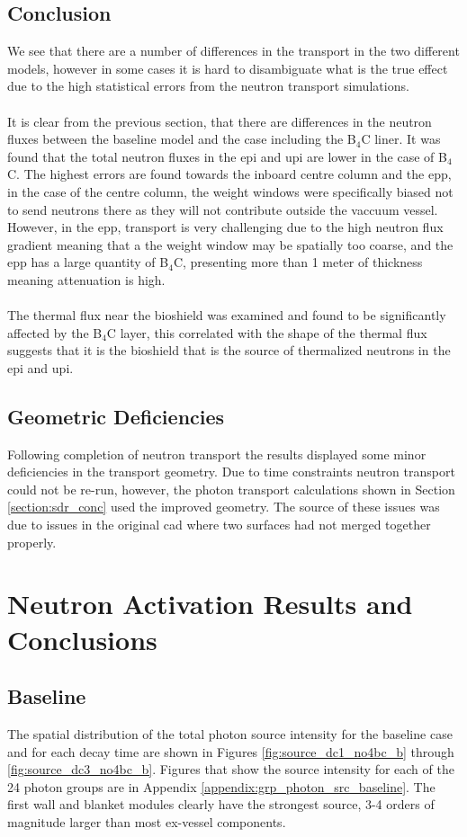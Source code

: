 \documentclass[12pt]{article}
\begin{document}
\subsection{Conclusion}
We see that there are a number of differences in the transport in the two different models,
however in some cases it is hard to disambiguate what is the true effect due to the high 
statistical errors from the neutron transport simulations. 
\\
\\
It is clear from the previous section, that there are differences in the neutron fluxes 
between the baseline model and the case including the B$_4$C liner. It was found that 
the total neutron fluxes in the \gls{epi} and \gls{upi} are lower in the case of B$_4$C.
The highest errors are found towards the inboard centre column and the \gls{epp}, 
in the case of the centre column, the weight windows were specifically biased not to send
neutrons there as they will not contribute outside the vaccuum vessel. However, in the 
\gls{epp}, transport is very challenging due to the high neutron flux gradient meaning that
a the weight window may be spatially too coarse, and the \gls{epp} has a large quantity of
B$_4$C, presenting more than 1 meter of thickness meaning attenuation is high. 
\\
\\
The thermal flux near the bioshield was examined and found to be significantly affected
by the B$_4$C layer, this correlated with the shape of the thermal flux suggests that 
it is the bioshield that is the source of thermalized neutrons in the \gls{epi} and \gls{upi}.
\subsection*{Geometric Deficiencies}
Following completion of neutron transport the results displayed some minor deficiencies in 
the transport geometry. Due to time constraints neutron transport could not be re-run, however,
the photon transport calculations shown in Section \ref{section:sdr_conc} used the improved geometry.
The source of these issues was due to issues in the original \gls{cad} where two surfaces had not 
merged together properly. 
\newpage
\clearpage

\section{Neutron Activation Results and Conclusions}
\subsection{Baseline}
The spatial distribution of the total photon source intensity for the baseline case 
and for each decay
time are shown in Figures \ref{fig:source_dc1_no4bc_b}
through \ref{fig:source_dc3_no4bc_b}.  Figures that show the source intensity
for each of the 24 photon groups are in
Appendix \ref{appendix:grp_photon_src_baseline}.  The first wall and blanket modules
clearly have the strongest source, 3-4 orders of magnitude larger than most
ex-vessel components.  
\end{document}
